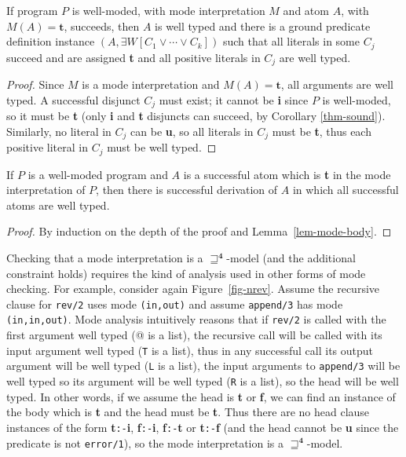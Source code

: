 \documentclass{tlp}
\newcommand{\Quad}{\ensuremath{\mathbf{4}}}
\begin{document}
\begin{lemma} \rm
\label{lem-mode-body}
If program $P$ is well-moded, with mode interpretation $M$ and
atom $A$, with $M(A) = \mathbf{t}$, succeeds, then
$A$ is well typed and there is a ground
predicate definition instance $(A, \exists W[C_1 \lor \cdots \lor C_k])$
such that all literals in some $C_j$ succeed and are
assigned \textbf{t} and all positive literals in $C_j$ are well typed.
\end{lemma}
\begin{proof}
Since $M$ is a mode interpretation and $M(A) = \mathbf{t}$,
all arguments are well typed.
A successful disjunct $C_j$ must exist; it cannot be \textbf{i} since
$P$ is well-moded, so it must be \textbf{t} (only \textbf{i} and
\textbf{t} disjuncts can succeed, by Corollary
\ref{thm-sound}).  Similarly, no literal in $C_j$ can be \textbf{u}, so
all literals in $C_j$ must be \textbf{t}, thus each positive literal in
$C_j$ must be well typed.
\end{proof}

\begin{theorem} \rm
\label{thm-mode-deriv}
If $P$ is a well-moded program
and $A$ is a successful atom which is \textbf{t} in the mode
interpretation of $P$, then there is successful derivation of $A$ in
which all successful atoms are well typed.
\end{theorem}
\begin{proof}
By induction on the depth of the proof and Lemma~\ref{lem-mode-body}.
\end{proof}


\noindent
Checking that a mode interpretation is a $\sqsupseteq^\Quad$-model
(and the additional constraint holds)
requires the kind of analysis used in other forms of mode checking.
For example, consider again Figure~\ref{fig-nrev}.
Assume the recursive clause for \texttt{rev/2}
uses mode \texttt{(in,out)} and assume \texttt{append/3} has
mode \texttt{(in,in,out)}.  Mode analysis intuitively reasons that if
\texttt{rev/2} is called with the first argument well typed (\verb@[H|T]@
is a list), the recursive call will be called with its input argument
well typed (\texttt{T} is a list), thus in any successful call its
output argument will be well typed (\texttt{L} is a list), the input
arguments to \texttt{append/3} will be well typed so its argument will
be well typed (\texttt{R} is a list), so the head will be well typed.
In other words, if we assume the head is \textbf{t} or \textbf{f},
we can find an instance of the body which is \textbf{t} and the head
must be \textbf{t}.  Thus there are no head clause instances of the
form \textbf{t}\texttt{:-}\textbf{i}, \textbf{f}\texttt{:-}\textbf{i},
\textbf{f}\texttt{:-}\textbf{t} or \textbf{t}\texttt{:-}\textbf{f}
(and the head cannot be \textbf{u} since the predicate is not 
\texttt{error/1}), 
so the mode interpretation is a $\sqsupseteq^\Quad$-model.
\end{document}
